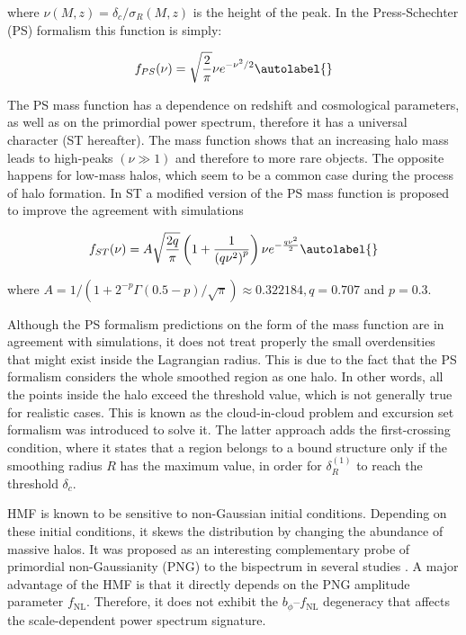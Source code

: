 where $\nu(M, z)=\delta_{c} / \sigma_{R}(M, z)$ is the height of the peak. In the Press-Schechter (PS) formalism this function is simply:


\begin{equation}
    f_{P S}(\nu)=\sqrt{\frac{2}{\pi}} \nu e^{-\nu^{2} / 2} \autolabel{}
\end{equation}


The PS mass function has a dependence on redshift and cosmological parameters, as well as on the primordial power spectrum, therefore it has a universal character \cite{Sheth_1999} (ST hereafter). The mass function shows that an increasing halo mass leads to high-peaks $(\nu \gg 1)$ and therefore to more rare objects. The opposite happens for low-mass halos, which seem to be a common case during the process of halo formation. In ST \cite{Sheth_1999}  a modified version of the PS mass function is proposed to improve the agreement with simulations


\begin{equation}
    f_{S T}(\nu)=A \sqrt{\frac{2 q}{\pi}}\left(1+\frac{1}{\left(q \nu^{2}\right)^{p}}\right) \nu e^{-\frac{q \nu^{2}}{2}} \autolabel{}
\end{equation}


where $A=1 /\left(1+2^{-p} \Gamma(0.5-p) / \sqrt{\pi}\right) \approx 0.322184, q=0.707$ and $p=0.3$.

Although the PS formalism predictions on the form of the mass function are in agreement with simulations, it does not treat properly the small overdensities that might exist inside the Lagrangian radius. This is due to the fact that the PS formalism considers the whole smoothed region as one halo. In other words, all the points inside the halo exceed the threshold value, which is not generally true for realistic cases. This is known as the cloud-in-cloud problem and excursion set formalism was introduced \cite{Bond1991ApJ...379..440B} to solve it. The latter approach adds the first-crossing condition, where it states that a region belongs to a bound structure only if the smoothing radius $R$ has the maximum value, in order for $\delta_{R}^{(1)}$ to reach the threshold $\delta_{c}$.

HMF is known to be sensitive to non-Gaussian initial conditions. Depending on these initial conditions, it skews the distribution by changing the abundance of massive halos. It was proposed as an interesting complementary probe of primordial non-Gaussianity (PNG) to the bispectrum in several studies \cite{Matarrese_2000, Desjacques_2009, Sefusatti_2007, Sefusatti_2009}. A major advantage of the HMF is that it directly depends on the PNG amplitude parameter $f_{\text{NL}}$. Therefore, it does not exhibit the $b_{\phi}$–$f_{\text{NL}}$ degeneracy that affects the scale-dependent power spectrum signature.

